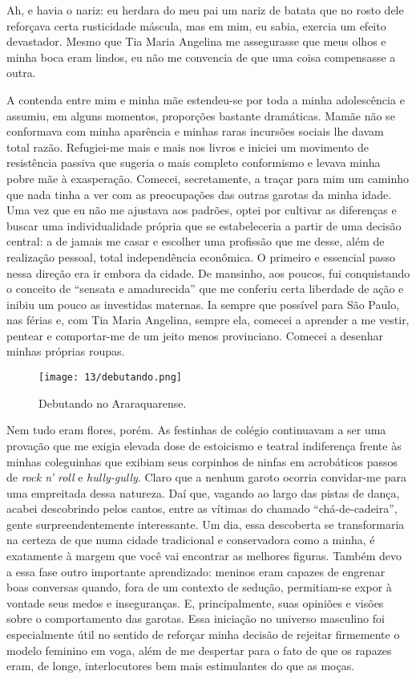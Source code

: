 Ah, e havia o nariz: eu herdara do meu pai um nariz de batata que no rosto dele reforçava certa rusticidade máscula, mas em mim, eu sabia, exercia um efeito devastador.
Mesmo que Tia Maria Angelina me assegurasse que meus olhos e minha boca eram lindos, eu não me convencia de que uma coisa compensasse a outra.

A contenda entre mim e minha mãe estendeu-se por toda a minha adolescência e assumiu, em alguns momentos, proporções bastante dramáticas.
Mamãe não se conformava com minha aparência e minhas raras incursões sociais lhe davam total razão.
Refugiei-me mais e mais nos livros e iniciei um movimento de resistência passiva que sugeria o mais completo conformismo e levava minha pobre mãe à exasperação.
Comecei, secretamente, a traçar para mim um caminho que nada tinha a ver com as preocupações das outras garotas da minha idade.
Uma vez que eu não me ajustava aos padrões, optei por cultivar as diferenças e buscar uma individualidade própria que se estabeleceria a partir de uma decisão central: a de jamais me casar e escolher uma profissão que me desse, além de realização pessoal, total independência econômica.
O primeiro e essencial passo nessa direção era ir embora da cidade.
De mansinho, aos poucos, fui conquistando o conceito de ``sensata e amadurecida'' que me conferiu certa liberdade de ação e inibiu um pouco as investidas maternas.
Ia sempre que possível para São Paulo, nas férias e, com Tia Maria Angelina, sempre ela, comecei a aprender a me vestir, pentear e comportar-me de um jeito menos provinciano.
Comecei a desenhar minhas próprias roupas.

\begin{figure}
\centering
\texttt{[image: 13/debutando.png]}
\caption{Debutando no Araraquarense.}
\end{figure}

Nem tudo eram flores, porém.
As festinhas de colégio continuavam a ser uma provação que me exigia elevada dose de estoicismo e teatral indiferença frente às minhas coleguinhas que exibiam seus corpinhos de ninfas em acrobáticos passos de \textit{rock n' roll} e \textit{hully-gully}.
Claro que a nenhum garoto ocorria convidar-me para uma empreitada dessa natureza.
Daí que, vagando ao largo das pistas de dança, acabei descobrindo pelos cantos, entre as vítimas do chamado ``chá-de-cadeira'', gente surpreendentemente interessante.
Um dia, essa descoberta se transformaria na certeza de que numa cidade tradicional e conservadora como a minha, é exatamente à margem que você vai encontrar as melhores figuras.
Também devo a essa fase outro importante aprendizado: meninos eram capazes de engrenar boas conversas quando, fora de um contexto de sedução, permitiam-se expor à vontade seus medos e inseguranças.
E, principalmente, suas opiniões e visões sobre o comportamento das garotas.
Essa iniciação no universo masculino foi especialmente útil no sentido de reforçar minha decisão de rejeitar firmemente o modelo feminino em voga, além de me despertar para o fato de que os rapazes eram, de longe, interlocutores bem mais estimulantes do que as moças.


